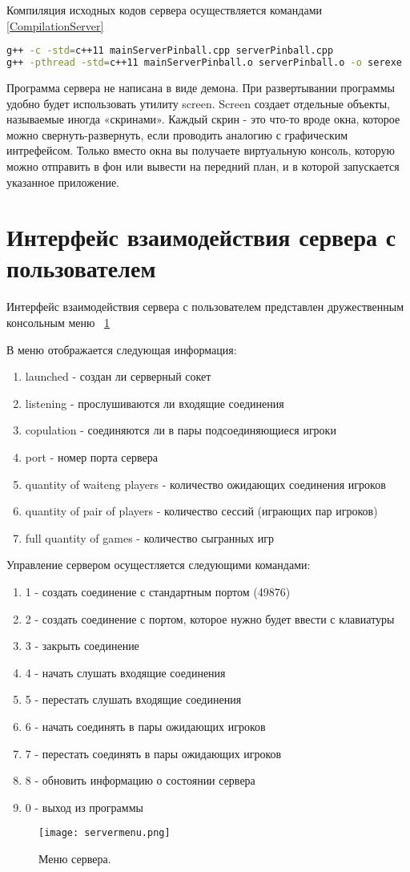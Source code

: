 Компиляция исходных кодов сервера осуществляется командами \ref{CompilationServer}

\begin{lstlisting}[language=bash, caption={Компиляция исходных кодов сервера},label=CompilationServer]
g++ -c -std=c++11 mainServerPinball.cpp serverPinball.cpp 
g++ -pthread -std=c++11 mainServerPinball.o serverPinball.o -o serexe
\end{lstlisting}

Программа сервера не написана в виде демона. При развертывании программы удобно будет использовать утилиту screen. Screen создает отдельные объекты, называемые иногда «скринами». Каждый скрин - это что-то вроде окна, которое можно свернуть-развернуть, если проводить аналогию с графическим интрефейсом. Только вместо окна вы получаете виртуальную консоль, которую можно отправить в фон или вывести на передний план, и в которой запускается указанное приложение.

\section{Интерфейс взаимодействия сервера с пользователем}

Интерфейс взаимодействия сервера с пользователем представлен дружественным консольным меню ~\ref{image:servermenu} 

В меню отображается следующая информация:
\begin{enumerate}
\item launched - создан ли серверный сокет
\item listening - прослушиваются ли входящие соединения 
\item copulation - соединяются ли в пары подсоединяющиеся игроки
\item port - номер порта сервера
\item quantity of waiteng players - количество ожидающих соединения игроков
\item quantity of pair of players - количество сессий (играющих пар игроков)
\item full quantity of games - количество сыгранных игр
\end{enumerate}

Управление сервером осущестляется следующими командами:
\begin{enumerate}
\item 1 - создать соединение с стандартным портом (49876)
\item 2 - создать соединение с портом, которое нужно будет ввести с клавиатуры
\item 3 - закрыть соединение
\item 4 - начать слушать входящие соединения
\item 5 - перестать слушать входящие соединения
\item 6 - начать соединять в пары ожидающих игроков
\item 7 - перестать соединять в пары ожидающих игроков
\item 8 - обновить информацию о состоянии сервера
\item 0 - выход из программы
\end{enumerate}

\begin{figure}[h]
  \centering
  \texttt{[image: servermenu.png]}
  \caption{Меню сервера.}
  \label{image:servermenu}
\end{figure}

